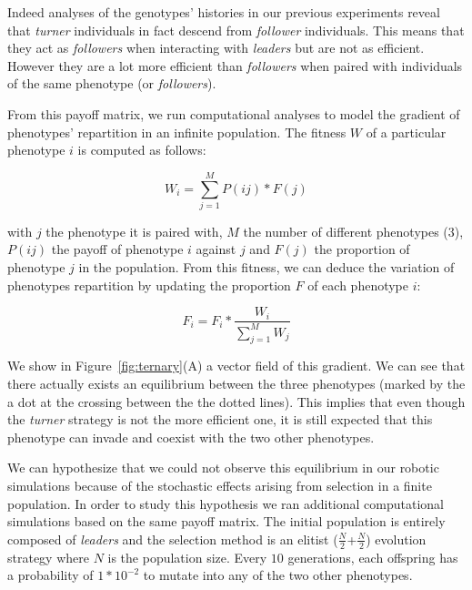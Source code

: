   Indeed analyses of the genotypes' histories in our previous experiments reveal that \emph{turner} individuals in fact descend from \emph{follower} individuals. This means that they act as \emph{followers} when interacting with \emph{leaders} but are not as efficient. However they are a lot more efficient than \emph{followers} when paired with individuals of the same phenotype (or \emph{followers}).


  From this payoff matrix, we run computational analyses to model the gradient of phenotypes' repartition in an infinite population. The fitness \(W\) of a particular phenotype \(i\) is computed as follows:

  \[
    W_{i} = \sum_{j=1}^{M} P(ij)*F(j)
  \]

  with \(j\) the phenotype it is paired with, \(M\) the number of different phenotypes ($3$), \(P(ij)\) the payoff of phenotype \(i\) against \(j\) and \(F(j)\) the proportion of phenotype \(j\) in the population. From this fitness, we can deduce the variation of phenotypes repartition by updating the proportion \(F\) of each phenotype \(i\): 

  \[
    F_{i} = F_{i}*\frac{W_{i}}{\sum_{j=1}^{M} W_{j}}
  \]

  We show in Figure~\ref{fig:ternary}(A) a vector field of this gradient. We can see that there actually exists an equilibrium between the three phenotypes (marked by the a dot at the crossing between the the dotted lines). This implies that even though the \emph{turner} strategy is not the more efficient one, it is still expected that this phenotype can invade and coexist with the two other phenotypes.

  We can hypothesize that we could not observe this equilibrium in our robotic simulations because of the stochastic effects arising from selection in a finite population. In order to study this hypothesis we ran additional computational simulations based on the same payoff matrix. The initial population is entirely composed of \emph{leaders} and the selection method is an elitist (\(\frac{N}{2}\)+\(\frac{N}{2}\)) evolution strategy where \(N\) is the population size. Every $10$ generations, each offspring has a probability of \(1*10^{-2}\) to mutate into any of the two other phenotypes.

